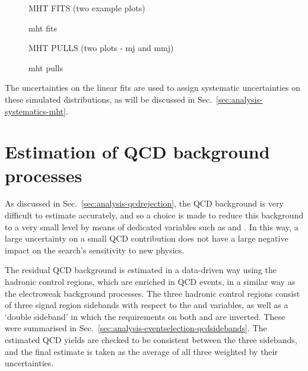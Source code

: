 \begin{figure}
MHT FITS (two example plots)
\caption{mht fits}
\label{fig:mhtvalidation-fits}
\end{figure}

\begin{figure}
MHT PULLS (two plots - mj and mmj)
\caption{mht pulls}
\label{fig:mhtvalidation-pulls}
\end{figure}

The uncertainties on the linear fits are used to assign systematic 
uncertainties on these simulated \mht distributions, as will be discussed in 
Sec.~\ref{sec:analysis-systematics-mht}.

\section{Estimation of QCD background processes}
\label{sec:analysis-estimation-qcd}
As discussed in Sec.~\ref{sec:analysis-qcdrejection}, the QCD background is 
very difficult to estimate accurately, and so a choice is made to reduce this 
background to a very small level by means of dedicated variables such as 
\alphat and \bdphi. In this way, a large uncertainty on a small QCD 
contribution does not have a large negative impact on the search's sensitivity 
to new physics. 

The residual QCD background is estimated in a data-driven way using the 
hadronic control regions, which are enriched in QCD events, in a similar way as 
the electroweak background processes. The three hadronic control regions 
consist of three signal region sidebands with respect to the \mhtmet and \bdphi 
variables, as well as a `double sideband' in which the requirements on both 
\mhtmet and \bdphi are inverted. These were summarised in 
Sec.~\ref{sec:analysis-eventselection-qcdsidebands}. The estimated QCD yields 
are checked to be consistent between the three sidebands, and the final 
estimate is taken as the average of all three weighted by their uncertainties.

